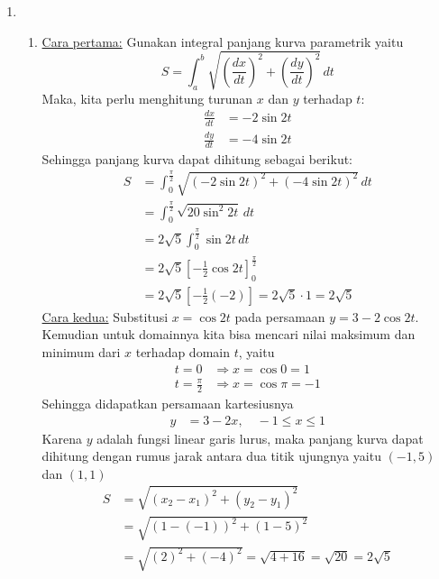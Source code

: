 \documentclass[11pt,openany,a4paper]{article}
\begin{document}
\begin{enumerate}
      \item 
      \begin{enumerate}
        \item \underline{Cara pertama:} Gunakan integral panjang kurva parametrik yaitu
        \[
        S = \int_{a}^{b} \sqrt{\left(\frac{dx}{dt}\right)^2 + \left(\frac{dy}{dt}\right)^2} \, dt
        \]
        Maka, kita perlu menghitung turunan \( x \) dan \( y \) terhadap \( t \):
        \begin{align*}
            \frac{dx}{dt} &= -2\sin 2t \\
            \frac{dy}{dt} &= -4\sin 2t
        \end{align*}
        Sehingga panjang kurva dapat dihitung sebagai berikut:
        \begin{align*}
            S &= \int_{0}^{\frac{\pi}{2}} \sqrt{\left(-2\sin 2t\right)^2 + \left(-4\sin 2t\right)^2} \, dt \\
            &= \int_{0}^{\frac{\pi}{2}} \sqrt{20\sin^2 2t} \, dt \\
            &= 2\sqrt{5} \int_{0}^{\frac{\pi}{2}} \sin 2t \, dt \\
            &= 2\sqrt{5} \left[ -\frac{1}{2}\cos 2t \right]_{0}^{\frac{\pi}{2}} \\
            &= 2\sqrt{5} \left[ -\frac{1}{2}\left(-2\right) \right] = 2\sqrt{5} \cdot 1 = \boxed{2\sqrt{5}}
        \end{align*}
        \underline{Cara kedua:} Substitusi \( x = \cos 2t \) pada persamaan $y = 3 - 2\cos 2t$. Kemudian untuk domainnya kita bisa mencari nilai maksimum dan minimum dari \( x \) terhadap domain $t$, yaitu
        \begin{align*}
            t=0 &\Rightarrow x = \cos 0 = 1 \\
            t=\frac{\pi}{2} &\Rightarrow x = \cos \pi = -1
        \end{align*}
        Sehingga didapatkan persamaan kartesiusnya
        \begin{align*}
            y &= 3 - 2x, \quad -1 \leq x \leq 1
        \end{align*}
        Karena \( y \) adalah fungsi linear garis lurus, maka panjang kurva dapat dihitung dengan rumus jarak antara dua titik ujungnya yaitu $(-1, 5)$ dan $(1, 1)$
        \begin{align*}
            S &= \sqrt{(x_2 - x_1)^2 + (y_2 - y_1)^2} \\
            &= \sqrt{(1 - (-1))^2 + (1 - 5)^2} \\
            &= \sqrt{(2)^2 + (-4)^2} = \sqrt{4 + 16} = \sqrt{20} = \boxed{2\sqrt{5}}

\end{align*}
\end{enumerate}
\end{enumerate}
\end{document}
